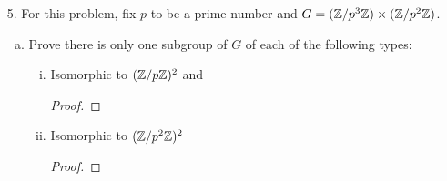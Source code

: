\begin{itemize}
\begin{enumerate}[(a)]
\begin{proof}
\end{proof}

\item Show that $I \subsetneq R$ is primary if and only if every zero divisor of $R/I$ is
nilpotent.
\begin{proof}

\end{proof}

\item Show that an ideal $I \subsetneq R$ is prime if and only if it is both radical and
primary.
\begin{proof}

\end{proof}

\item Show that the ideal $I \subsetneq R$ is prime if and only if the ideal $I[x] := \{\sum_{k=0}^{n} \alpha_k x^k| \alpha_k \in I\}$ is a prime ideal of $R[x]$.
\begin{proof}

\end{proof}

\item Now let $R$ be a principal ideal domain (PID). Characterize all nonzero
proper ideals of $R$ that are radical, and characterize all nonzero proper ideals
of $R$ that are primary.
\begin{proof}

\end{proof}
\end{enumerate}






\item[5.] For this problem, fix $p$ to be a prime number and $G = (\mathbb{Z}/p^3\mathbb{Z}) \times (\mathbb{Z}/p^2\mathbb{Z})$.
\begin{enumerate}[(a)]
\item Prove there is only one subgroup of $G$ of each of the following types:
    \begin{enumerate}[(i)]
        \item Isomorphic to $(\mathbb{Z}/p\mathbb{Z})^2$ and
        \begin{proof}

        \end{proof}
        
        \item Isomorphic to $(\mathbb{Z}/p^2\mathbb{Z})^2$
        \begin{proof}

        \end{proof}
    \end{enumerate}



\end{enumerate}
\end{itemize}
